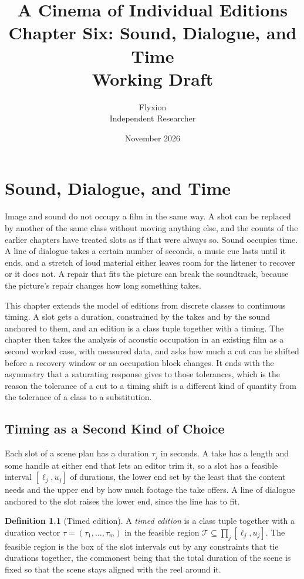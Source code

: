 \documentclass[11pt,twoside,openright]{book}
\title{\Huge\bfseries A Cinema of Individual Editions\\[1.2ex]
\large Chapter Six: Sound, Dialogue, and Time\\[0.4ex]
\large Working Draft}
\author{Flyxion\\[0.3ex]\small Independent Researcher}
\date{November 2026}
\theoremstyle{plain}
\theoremstyle{definition}
\newtheorem{definition}[theorem]{Definition}
\theoremstyle{remark}
\begin{document}
\frontmatter
\maketitle
\tableofcontents
\mainmatter
\setcounter{chapter}{5}

\chapter{Sound, Dialogue, and Time}
\label{ch:sound}

Image and sound do not occupy a film in the same way. A shot can be replaced by another of the same class without moving anything else, and the counts of the earlier chapters have treated slots as if that were always so. Sound occupies time. A line of dialogue takes a certain number of seconds, a music cue lasts until it ends, and a stretch of loud material either leaves room for the listener to recover or it does not. A repair that fits the picture can break the soundtrack, because the picture's repair changes how long something takes.

This chapter extends the model of editions from discrete classes to continuous timing. A slot gets a duration, constrained by the takes and by the sound anchored to them, and an edition is a class tuple together with a timing. The chapter then takes the analysis of acoustic occupation in an existing film as a second worked case, with measured data, and asks how much a cut can be shifted before a recovery window or an occupation block changes. It ends with the asymmetry that a saturating response gives to those tolerances, which is the reason the tolerance of a cut to a timing shift is a different kind of quantity from the tolerance of a class to a substitution.

\section{Timing as a Second Kind of Choice}\label{sec:timing}

Each slot of a scene plan has a duration $\tau_j$ in seconds. A take has a length and some handle at either end that lets an editor trim it, so a slot has a feasible interval $[\ell_j,u_j]$ of durations, the lower end set by the least that the content needs and the upper end by how much footage the take offers. A line of dialogue anchored to the slot raises the lower end, since the line has to fit.

\begin{definition}[Timed edition]\label{def:timed}
A \emph{timed edition} is a class tuple together with a duration vector $\tau=(\tau_1,\dots,\tau_m)$ in the feasible region $\mathcal T\subseteq\prod_j[\ell_j,u_j]$. The feasible region is the box of the slot intervals cut by any constraints that tie durations together, the commonest being that the total duration of the scene is fixed so that the scene stays aligned with the reel around it.
\end{definition}
\end{document}
